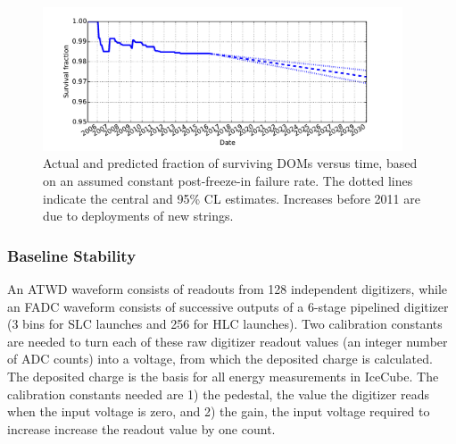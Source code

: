 \begin{figure}[!h]
 \centering
 \includegraphics[width=0.95\textwidth]{graphics/dom/reliability/dom_survival.pdf}
 \caption{Actual and predicted fraction of surviving DOMs versus time, based on an assumed
 constant post-freeze-in failure rate.  The dotted lines indicate the
 central and 95\% CL estimates.  Increases before 2011 are due
 to deployments of new strings.} 
 \label{fig:dom_survival}
\end{figure}


\subsubsection{Baseline Stability}

An ATWD waveform consists of readouts from 128 independent digitizers,
while an FADC waveform consists of successive outputs of a 6-stage
pipelined digitizer (3 bins for SLC launches and 256 for HLC
launches). Two calibration constants are needed to turn each of these
raw digitizer readout values (an integer number of ADC counts) into a
voltage, from which the deposited charge is calculated. The deposited
charge is the basis for all energy measurements in IceCube. The
calibration constants needed are 1) the pedestal, the value the digitizer reads when the input voltage is zero, and
2) the gain, the input voltage required to increase increase the readout value by one count. 

